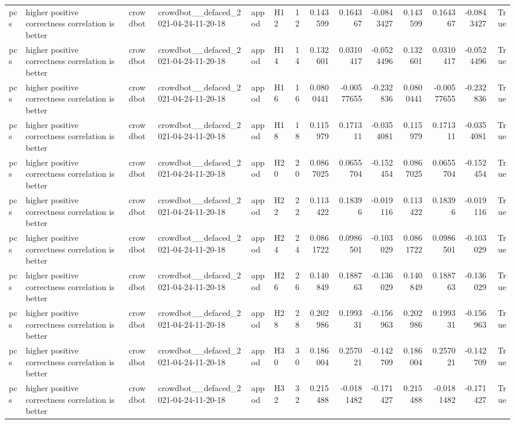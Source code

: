 \begin{longtable}{llllllrrrrrrrr}
pcs & higher positive correctness correlation is better & crowdbot & crowdbot\_\_defaced\_2021-04-24-11-20-18 & appod & H12 & 12 & 0.143599 & 0.164367 & -0.0843427 & 0.143599 & 0.164367 & -0.0843427 & True \\
pcs & higher positive correctness correlation is better & crowdbot & crowdbot\_\_defaced\_2021-04-24-11-20-18 & appod & H14 & 14 & 0.132601 & 0.0310417 & -0.0524496 & 0.132601 & 0.0310417 & -0.0524496 & True \\
pcs & higher positive correctness correlation is better & crowdbot & crowdbot\_\_defaced\_2021-04-24-11-20-18 & appod & H16 & 16 & 0.0800441 & -0.00577655 & -0.232836 & 0.0800441 & -0.00577655 & -0.232836 & True \\
pcs & higher positive correctness correlation is better & crowdbot & crowdbot\_\_defaced\_2021-04-24-11-20-18 & appod & H18 & 18 & 0.115979 & 0.171311 & -0.0354081 & 0.115979 & 0.171311 & -0.0354081 & True \\
pcs & higher positive correctness correlation is better & crowdbot & crowdbot\_\_defaced\_2021-04-24-11-20-18 & appod & H20 & 20 & 0.0867025 & 0.0655704 & -0.152454 & 0.0867025 & 0.0655704 & -0.152454 & True \\
pcs & higher positive correctness correlation is better & crowdbot & crowdbot\_\_defaced\_2021-04-24-11-20-18 & appod & H22 & 22 & 0.113422 & 0.18396 & -0.019116 & 0.113422 & 0.18396 & -0.019116 & True \\
pcs & higher positive correctness correlation is better & crowdbot & crowdbot\_\_defaced\_2021-04-24-11-20-18 & appod & H24 & 24 & 0.0861722 & 0.0986501 & -0.103029 & 0.0861722 & 0.0986501 & -0.103029 & True \\
pcs & higher positive correctness correlation is better & crowdbot & crowdbot\_\_defaced\_2021-04-24-11-20-18 & appod & H26 & 26 & 0.140849 & 0.188763 & -0.136029 & 0.140849 & 0.188763 & -0.136029 & True \\
pcs & higher positive correctness correlation is better & crowdbot & crowdbot\_\_defaced\_2021-04-24-11-20-18 & appod & H28 & 28 & 0.202986 & 0.199331 & -0.156963 & 0.202986 & 0.199331 & -0.156963 & True \\
pcs & higher positive correctness correlation is better & crowdbot & crowdbot\_\_defaced\_2021-04-24-11-20-18 & appod & H30 & 30 & 0.186004 & 0.257021 & -0.142709 & 0.186004 & 0.257021 & -0.142709 & True \\
pcs & higher positive correctness correlation is better & crowdbot & crowdbot\_\_defaced\_2021-04-24-11-20-18 & appod & H32 & 32 & 0.215488 & -0.0181482 & -0.171427 & 0.215488 & -0.0181482 & -0.171427 & True \\

\end{longtable}
